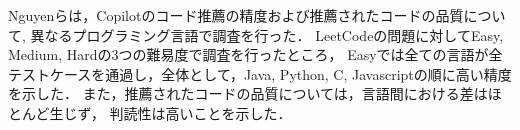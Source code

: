   Nguyen\cite{Nguyen2022MSR}らは，Copilotのコード推薦の精度および推薦されたコードの品質について,
  異なるプログラミング言語で調査を行った．
  LeetCodeの問題に対してEasy, Medium, Hardの3つの難易度で調査を行ったところ，
  Easyでは全ての言語が全テストケースを通過し，全体として，Java, Python, C, Javascriptの順に高い精度を示した．
  また，推薦されたコードの品質については，言語間における差はほとんど生じず，
  判読性は高いことを示した．


  